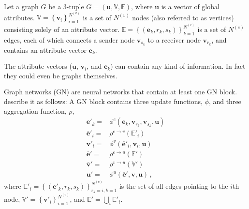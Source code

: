 Let a graph $G$ be a 3-tuple $G=\left(\bm{u},\mathbb{V},\mathbb{E}\right)$, where $\bm{u}$ is a vector of global attributes.
$\mathbb{V}=\left\{\bm{v}_i\right\}_{i=1}^{N^{(v)}}$ is a set of $N^{(v)}$ nodes (also referred to as vertices) consisting solely of an attribute vector.
$\mathbb{E}=\left\{\left(\bm{e}_k,r_k,s_k\right)\right\}_{k=1}^{N^{(e)}}$ is a set of $N^{(e)}$ edges, each of which connects a sender node $\bm{v}_{s_k}$ to a receiver node $\bm{v}_{r_k}$, and contains an attribute vector $\bm{e}_k$.

The attribute vectors ($\bm{u}$, $\bm{v}_i$, and $\bm{e}_k$) can contain any kind of information. In fact they could even be graphs themselves.

Graph networks (GN) are neural networks that contain at least one GN block. \cite{deepmind:graphnets} describe it as follows: A GN block contains three update functions, $\phi$, and three aggregation function, $\rho$,
\begin{align}
    \bm{e}'_k=&\phi^e\left(\bm{e}_k,\bm{v}_{r_k},\bm{v}_{s_k},\bm{u}\right)\\
    \bm{\overline{e}}'_i=&\rho^{e\rightarrow v}\left(\mathbb{E}'_i\right)\\
    \bm{v}'_i=&\phi^v\left(\bm{\overline{e}}'_i,\bm{v}_i,\bm{u}\right)\\
    \bm{\overline{e}}'=&\rho^{e\rightarrow u}\left(\mathbb{E}'\right)\\
    \bm{\overline{v}}'=&\rho^{v\rightarrow u}\left(\mathbb{V}'\right)\\
    \bm{u}'=&\phi^u\left(\bm{\overline{e}}',\bm{\overline{v}},\bm{u}\right)\,,
\end{align}
where $\mathbb{E}'_i=\left\{\left(\bm{e}'_k,r_k,s_k\right)\right\}_{r_k=i,k=1}^{N^{(e)}}$ is the set of all edges pointing to the $i$th node, $\mathbb{V}'=\left\{\bm{v}'_i\right\}_{i=1}^{N^{(v)}}$, and $\mathbb{E}'=\bigcup_i\mathbb{E}'_i$.

